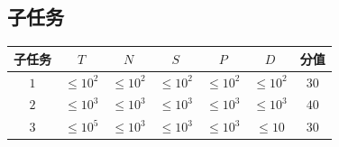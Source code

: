 \examplebox{}{}

\subsection*{子任务}

\begin{table}[H]
\centering
\begin{tabular}{ccccccc}
    \toprule
    子任务 & $T$ & $N$ & $S$ & $P$ & $D$ & 分值 \\
    \midrule
    $1$ & $\le 10^2$ & $\le 10^2$ & $\le 10^2$ & $\le 10^2$ & $\le 10^2$ & $30$ \\
    $2$ & $\le 10^3$ & $\le 10^3$ & $\le 10^3$ & $\le 10^3$ & $\le 10^3$ & $40$ \\
    $3$ & $\le 10^5$ & $\le 10^3$ & $\le 10^3$ & $\le 10^3$ & $\le 10$ & $30$ \\
    \bottomrule
\end{tabular}
\end{table}

